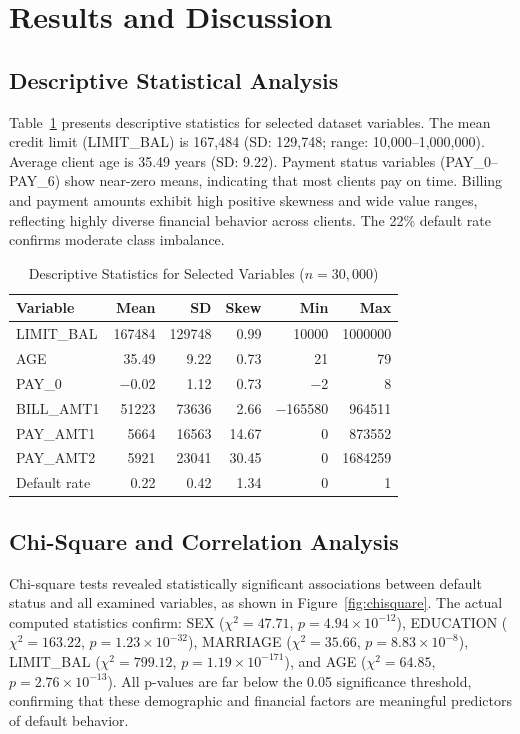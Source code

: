 \documentclass[sigconf]{acmart}
\begin{document}
\section{Results and Discussion}

\subsection{Descriptive Statistical Analysis}
Table~\ref{tab:descriptive} presents descriptive statistics for selected dataset variables. The mean credit limit (LIMIT\_BAL) is 167,484 (SD: 129,748; range: 10,000--1,000,000). Average client age is 35.49 years (SD: 9.22). Payment status variables (PAY\_0--PAY\_6) show near-zero means, indicating that most clients pay on time. Billing and payment amounts exhibit high positive skewness and wide value ranges, reflecting highly diverse financial behavior across clients. The 22\% default rate confirms moderate class imbalance.

\begin{table}[h]
\caption{Descriptive Statistics for Selected Variables ($n = 30{,}000$)}
\label{tab:descriptive}
\begin{tabular}{lrrrrr}
\toprule
Variable & Mean & SD & Skew & Min & Max \\
\midrule
LIMIT\_BAL & 167484 & 129748 & 0.99 & 10000 & 1000000 \\
AGE & 35.49 & 9.22 & 0.73 & 21 & 79 \\
PAY\_0 & $-$0.02 & 1.12 & 0.73 & $-$2 & 8 \\
BILL\_AMT1 & 51223 & 73636 & 2.66 & $-$165580 & 964511 \\
PAY\_AMT1 & 5664 & 16563 & 14.67 & 0 & 873552 \\
PAY\_AMT2 & 5921 & 23041 & 30.45 & 0 & 1684259 \\
Default rate & 0.22 & 0.42 & 1.34 & 0 & 1 \\
\bottomrule
\end{tabular}
\end{table}

\subsection{Chi-Square and Correlation Analysis}

Chi-square tests revealed statistically significant associations between default status and all examined variables, as shown in Figure~\ref{fig:chisquare}. The actual computed statistics confirm: SEX ($\chi^2 = 47.71$, $p = 4.94{\times}10^{-12}$), EDUCATION ($\chi^2 = 163.22$, $p = 1.23{\times}10^{-32}$), MARRIAGE ($\chi^2 = 35.66$, $p = 8.83{\times}10^{-8}$), LIMIT\_BAL ($\chi^2 = 799.12$, $p = 1.19{\times}10^{-171}$), and AGE ($\chi^2 = 64.85$, $p = 2.76{\times}10^{-13}$). All p-values are far below the 0.05 significance threshold, confirming that these demographic and financial factors are meaningful predictors of default behavior.
\end{document}
